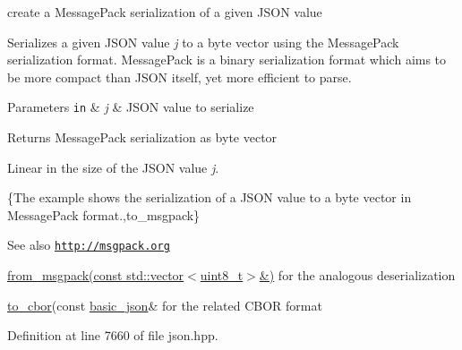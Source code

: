 create a Message\+Pack serialization of a given J\+S\+O\+N value 

Serializes a given J\+S\+O\+N value {\itshape j} to a byte vector using the Message\+Pack serialization format. Message\+Pack is a binary serialization format which aims to be more compact than J\+S\+O\+N itself, yet more efficient to parse.


\begin{DoxyParams}[1]{Parameters}
\mbox{\tt in}  & {\em j} & J\+S\+O\+N value to serialize \\
\hline
\end{DoxyParams}
\begin{DoxyReturn}{Returns}
Message\+Pack serialization as byte vector
\end{DoxyReturn}
Linear in the size of the J\+S\+O\+N value {\itshape j}.

\{The example shows the serialization of a J\+S\+O\+N value to a byte vector in Message\+Pack format.,to\+\_\+msgpack\}

\begin{DoxySeeAlso}{See also}
\href{http://msgpack.org}{\tt http\+://msgpack.\+org} 

\hyperlink{classnlohmann_1_1basic__json_a2efa0d7ddd2bb73d382ad08f153838c3}{from\+\_\+msgpack(const std\+::vector$<$uint8\+\_\+t$>$\&)} for the analogous deserialization 

\hyperlink{classnlohmann_1_1basic__json_a98b7780376d6b23fb04bd3cb29594b4b}{to\+\_\+cbor}(const \hyperlink{classnlohmann_1_1basic__json}{basic\+\_\+json}\& for the related C\+B\+O\+R format 
\end{DoxySeeAlso}


Definition at line 7660 of file json.\+hpp.

\hypertarget{classnlohmann_1_1basic__json_a2efa0d7ddd2bb73d382ad08f153838c3}{}
